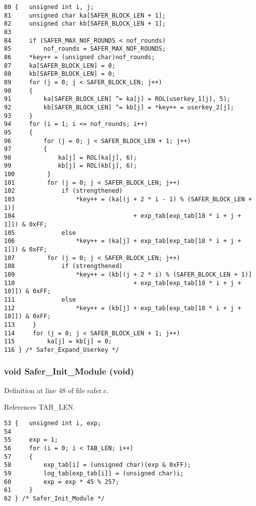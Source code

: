 \footnotesize\begin{verbatim}80 {   unsigned int i, j;
81     unsigned char ka[SAFER_BLOCK_LEN + 1];
82     unsigned char kb[SAFER_BLOCK_LEN + 1];
83 
84     if (SAFER_MAX_NOF_ROUNDS < nof_rounds)
85         nof_rounds = SAFER_MAX_NOF_ROUNDS;
86     *key++ = (unsigned char)nof_rounds;
87     ka[SAFER_BLOCK_LEN] = 0;
88     kb[SAFER_BLOCK_LEN] = 0;
89     for (j = 0; j < SAFER_BLOCK_LEN; j++)
90     {
91         ka[SAFER_BLOCK_LEN] ^= ka[j] = ROL(userkey_1[j], 5);
92         kb[SAFER_BLOCK_LEN] ^= kb[j] = *key++ = userkey_2[j];
93     }
94     for (i = 1; i <= nof_rounds; i++)
95     {
96         for (j = 0; j < SAFER_BLOCK_LEN + 1; j++)
97         {
98             ka[j] = ROL(ka[j], 6);
99             kb[j] = ROL(kb[j], 6);
100         }
101         for (j = 0; j < SAFER_BLOCK_LEN; j++)
102             if (strengthened)
103                 *key++ = (ka[(j + 2 * i - 1) % (SAFER_BLOCK_LEN + 1)]
104                                 + exp_tab[exp_tab[18 * i + j + 1]]) & 0xFF;
105             else
106                 *key++ = (ka[j] + exp_tab[exp_tab[18 * i + j + 1]]) & 0xFF;
107         for (j = 0; j < SAFER_BLOCK_LEN; j++)
108             if (strengthened)
109                 *key++ = (kb[(j + 2 * i) % (SAFER_BLOCK_LEN + 1)]
110                                 + exp_tab[exp_tab[18 * i + j + 10]]) & 0xFF;
111             else
112                 *key++ = (kb[j] + exp_tab[exp_tab[18 * i + j + 10]]) & 0xFF;
113     }
114     for (j = 0; j < SAFER_BLOCK_LEN + 1; j++)
115         ka[j] = kb[j] = 0;
116 } /* Safer_Expand_Userkey */
\end{verbatim}\normalsize 
{}
\subsubsection{\setlength{\rightskip}{0pt plus 5cm}void Safer\_\-Init\_\-Module (void)}\label{safer_8h_a9}




Definition at line 48 of file safer.c.

References TAB\_\-LEN.



\footnotesize\begin{verbatim}53 {   unsigned int i, exp;
54 
55     exp = 1;
56     for (i = 0; i < TAB_LEN; i++)
57     {
58         exp_tab[i] = (unsigned char)(exp & 0xFF);
59         log_tab[exp_tab[i]] = (unsigned char)i;
60         exp = exp * 45 % 257;
61     }
62 } /* Safer_Init_Module */
\end{verbatim}\normalsize 
